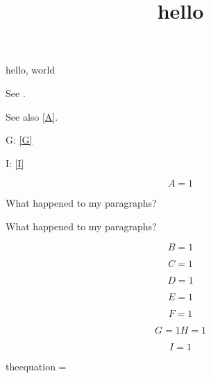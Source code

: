 \documentclass{amsart}
\title{hello}
\begin{document}

\maketitle

hello, world

See .

See also \eqref{A}.


G: \eqref{G}



I: \eqref{I}

\begin{equation}\label{A}
A = 1
\end{equation}

What happened to my paragraphs?

What happened to my paragraphs?

\begin{equation}\label{B}
B = 1
\end{equation}

\begin{equation}\label{C}
C = 1
\end{equation}

\begin{equation}\label{D}\tag{D1}
D = 1
\end{equation}

\begin{equation}\label{E}\tag{D2}
E = 1
\end{equation}

\begin{equation}\label{F}\tag{D3}
F = 1
\end{equation}

\begin{subequations}

\begin{equation}\label{G}
G = 1
\end{equation}

\begin{equation}\label{H}
H = 1
\end{equation}

\end{subequations}

\begin{equation}\label{I}
I = 1
\end{equation}

theequation = \theequation


\end{document}
